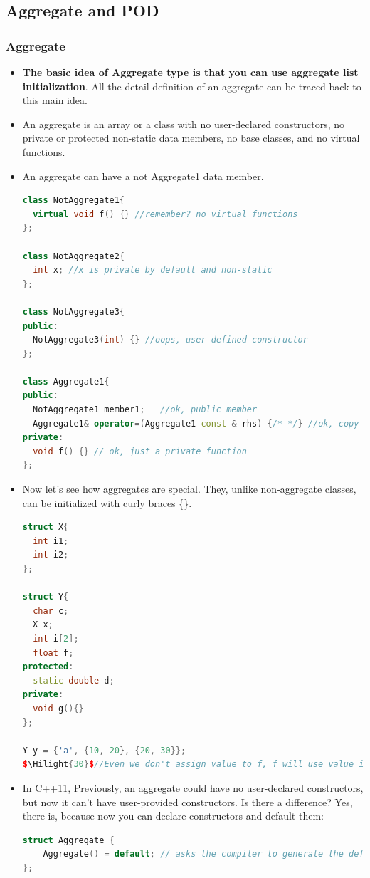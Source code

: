 \documentclass[a4paper,12pt,twoside]{book}
\newcommand{\Hilight}[1]{\makebox[0pt][l]{\color{yellow}\rule[-3pt]{#1em}{11pt}}}
\begin{document}
\subsection{Aggregate and POD}
\subsubsection{Aggregate}
\begin{itemize}
\item \textbf{The basic idea of Aggregate type is that you can use aggregate list initialization}. All the detail definition of an aggregate can be traced back to this main idea. 

\item An aggregate is an array or a class with no user-declared constructors, no private or protected non-static data members, no base classes, and no virtual functions.

\item  An aggregate can have a not Aggregate1 data member.
\begin{lstlisting}[frame=single, language=c++]
class NotAggregate1{
  virtual void f() {} //remember? no virtual functions
};

class NotAggregate2{
  int x; //x is private by default and non-static 
};

class NotAggregate3{
public:
  NotAggregate3(int) {} //oops, user-defined constructor
};

class Aggregate1{
public:
  NotAggregate1 member1;   //ok, public member
  Aggregate1& operator=(Aggregate1 const & rhs) {/* */} //ok, copy-assignment  
private:
  void f() {} // ok, just a private function
};
\end{lstlisting}

\item Now let's see how aggregates are special. They, unlike non-aggregate classes, can be initialized with curly braces \{\}. 
\begin{lstlisting}[frame=single, language=c++]
struct X{
  int i1;
  int i2;
};

struct Y{
  char c;
  X x;
  int i[2];
  float f; 
protected:
  static double d;
private:
  void g(){}      
}; 

Y y = {'a', {10, 20}, {20, 30}};
$\Hilight{30}$//Even we don't assign value to f, f will use value init. 
\end{lstlisting}

\item In C++11, Previously, an aggregate could have no user-declared constructors, but now it can't have user-provided constructors. Is there a difference? Yes, there is, because now you can declare constructors and default them:
\begin{lstlisting}[frame=single, language=c++]
struct Aggregate {
    Aggregate() = default; // asks the compiler to generate the default implementation
};
\end{lstlisting}


\end{itemize}
\end{document}
